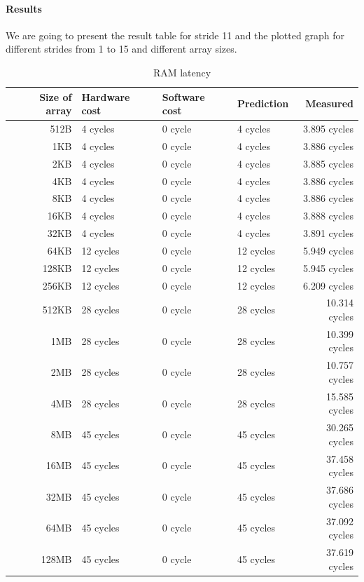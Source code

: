 \paragraph{Results}
We are going to present the result table for stride 11
and the plotted graph for different strides from 1 to 15
and different array sizes.

\begin{table}[t!]
\begin{center}
\begin{tabular}{| r | l | l | l | r |}
\hline
Size of array 	& Hardware cost 	& Software cost 	& Prediction 	& Measured \\ \hline
512B 		&	4 cycles	&	0 cycle		&	4 cycles	&3.895 cycles	\\ \hline
1KB 		&	4 cycles	&	0 cycle		&	4 cycles	&3.886 cycles		\\ \hline
2KB 		&	4 cycles	&	0 cycle		&	4 cycles	&3.885 cycles		\\ \hline
4KB 		&	4 cycles	&	0 cycle		&	4 cycles	&3.886 cycles		\\ \hline
8KB 		&	4 cycles	&	0 cycle		&	4 cycles	&3.886 cycles		\\ \hline
16KB 		&	4 cycles	&	0 cycle		&	4 cycles	&3.888 cycles		\\ \hline
32KB 		&	4 cycles	&	0 cycle		&	4 cycles	&3.891 cycles		\\ \hline
64KB 		&	12 cycles	&	0 cycle		&	12 cycles	&5.949 cycles		\\ \hline
128KB 		&	12 cycles	&	0 cycle		&	12 cycles	&5.945 cycles		\\ \hline
256KB 		&	12 cycles	&	0 cycle		&	12 cycles	&6.209 cycles		\\ \hline
512KB 		&	28 cycles	&	0 cycle		&	28 cycles	&10.314 cycles		\\ \hline
1MB 		&	28 cycles	&	0 cycle		&	28 cycles	&10.399 cycles		\\ \hline
2MB 		&	28 cycles	&	0 cycle		&	28 cycles	&10.757 cycles		\\ \hline
4MB 		&	28 cycles	&	0 cycle		&	28 cycles	&15.585 cycles		\\ \hline
8MB 		&	45 cycles	&	0 cycle		&	45 cycles	&30.265 cycles		\\ \hline
16MB 		&	45 cycles	&	0 cycle		&	45 cycles	&37.458 cycles		\\ \hline
32MB 		&	45 cycles	&	0 cycle		&	45 cycles	&37.686 cycles		\\ \hline
64MB 		&	45 cycles	&	0 cycle		&	45 cycles	&37.092 cycles		\\ \hline
128MB 		&	45 cycles	&	0 cycle		&	45 cycles	&37.619 cycles		\\ \hline

\hline
\end{tabular}
\end{center}
\caption{RAM latency\label{tab:access-time}}
\end{table}

